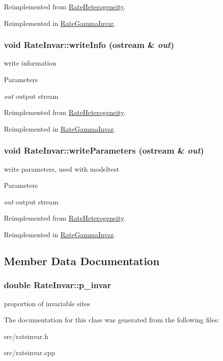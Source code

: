 Reimplemented from \hyperlink{classRateHeterogeneity_a1305d5b8481dd5a2482917ddb5fe57bd}{RateHeterogeneity}.

Reimplemented in \hyperlink{classRateGammaInvar_ab72a2559cea978d312a243d521c2abef}{RateGammaInvar}.\hypertarget{classRateInvar_a6b8c198319557891db9b91fb47b27428}{
\subsubsection[{writeInfo}]{\setlength{\rightskip}{0pt plus 5cm}void RateInvar::writeInfo (ostream \& {\em out})}}
\label{classRateInvar_a6b8c198319557891db9b91fb47b27428}
write information 
\begin{DoxyParams}{Parameters}
\item[{\em out}]output stream \end{DoxyParams}


Reimplemented from \hyperlink{classRateHeterogeneity_a520772859d465036b6620bdbf2977efe}{RateHeterogeneity}.

Reimplemented in \hyperlink{classRateGammaInvar_a428c3ac79ba1bf28da546f602d4b0f7b}{RateGammaInvar}.\hypertarget{classRateInvar_aabcef1cc18777b54b0f8644ccb00913c}{
\subsubsection[{writeParameters}]{\setlength{\rightskip}{0pt plus 5cm}void RateInvar::writeParameters (ostream \& {\em out})}}
\label{classRateInvar_aabcef1cc18777b54b0f8644ccb00913c}
write parameters, used with modeltest 
\begin{DoxyParams}{Parameters}
\item[{\em out}]output stream \end{DoxyParams}


Reimplemented from \hyperlink{classRateHeterogeneity_ad2832e686971cf1f2cac2a6f842a3550}{RateHeterogeneity}.

Reimplemented in \hyperlink{classRateGammaInvar_a13b6629de9e3579aacff555f1bd76db5}{RateGammaInvar}.

\subsection{Member Data Documentation}
\hypertarget{classRateInvar_af6b377196f15c6f58d115b8c24ddf00f}{
\subsubsection[{p\_\-invar}]{\setlength{\rightskip}{0pt plus 5cm}double {\bf RateInvar::p\_\-invar}}}
\label{classRateInvar_af6b377196f15c6f58d115b8c24ddf00f}
proportion of invariable sites 

The documentation for this class was generated from the following files:\begin{DoxyCompactItemize}
\item 
src/rateinvar.h\item 
src/rateinvar.cpp\end{DoxyCompactItemize}
